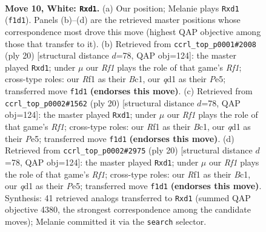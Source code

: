 \documentclass[11pt]{article}
\begin{document}
\clearpage

\begin{figure}[p]\centering
\begin{subfigure}{0.46\textwidth}\centering
\resizebox{\linewidth}{!}{%
\newchessgame
\chessboard[
  setfen={rnb2rk1/pp2bpp1/4pn2/2P4p/2N5/6P1/PP2PPBP/RNBq1RK1 w - - 0 10},
  showmover=false,
  pgfstyle=straightmove, color=movearrow, markmove={f1-d1}
]}
\caption{}
\end{subfigure}\hfill
\begin{subfigure}{0.46\textwidth}\centering
\resizebox{\linewidth}{!}{%
\newchessgame
\chessboard[
  setfen={r4rk1/ppp1ppbp/4bnp1/4P3/8/5NP1/PP2PPBP/R1Bq1RK1 w - - 0 11},
  showmover=false,
  pgfstyle=straightmove, color=movearrow, markmove={f1-d1}
]}
\caption{}
\end{subfigure}
\\[4pt]
\begin{subfigure}{0.46\textwidth}\centering
\resizebox{\linewidth}{!}{%
\newchessgame
\chessboard[
  setfen={r4rk1/ppp1ppbp/4bnp1/4P3/8/5NP1/PP2PPBP/R1Bq1RK1 w - - 0 11},
  showmover=false,
  pgfstyle=straightmove, color=movearrow, markmove={f1-d1}
]}
\caption{}
\end{subfigure}\hfill
\begin{subfigure}{0.46\textwidth}\centering
\resizebox{\linewidth}{!}{%
\newchessgame
\chessboard[
  setfen={r4rk1/ppp1ppbp/4bnp1/4P3/8/5NP1/PP2PPBP/R1Bq1RK1 w - - 0 11},
  showmover=false,
  pgfstyle=straightmove, color=movearrow, markmove={f1-d1}
]}
\caption{}
\end{subfigure}
\caption{\textbf{Move 10, White: \texttt{Rxd1}.} (a) Our position; Melanie plays \texttt{Rxd1} (\texttt{f1d1}). Panels (b)--(d) are the retrieved master positions whose correspondence most drove this move (highest QAP objective among those that transfer to it). (b) Retrieved from \texttt{ccrl\_top\_p0001\#2008} (ply 20) [structural distance $d$=78, QAP obj=124]: the master played \texttt{Rxd1}; under $\mu$ our \emph{Rf1} plays the role of that game's \emph{Rf1}; cross-type roles: our \emph{R}f1 as their \emph{B}c1, our \emph{q}d1 as their \emph{P}e5; transferred move \texttt{f1d1} \textbf{(endorses this move)}. (c) Retrieved from \texttt{ccrl\_top\_p0002\#1562} (ply 20) [structural distance $d$=78, QAP obj=124]: the master played \texttt{Rxd1}; under $\mu$ our \emph{Rf1} plays the role of that game's \emph{Rf1}; cross-type roles: our \emph{R}f1 as their \emph{B}c1, our \emph{q}d1 as their \emph{P}e5; transferred move \texttt{f1d1} \textbf{(endorses this move)}. (d) Retrieved from \texttt{ccrl\_top\_p0002\#2975} (ply 20) [structural distance $d$=78, QAP obj=124]: the master played \texttt{Rxd1}; under $\mu$ our \emph{Rf1} plays the role of that game's \emph{Rf1}; cross-type roles: our \emph{R}f1 as their \emph{B}c1, our \emph{q}d1 as their \emph{P}e5; transferred move \texttt{f1d1} \textbf{(endorses this move)}. Synthesis: 41 retrieved analogs transferred to \texttt{Rxd1} (summed QAP objective 4380, the strongest correspondence among the candidate moves); Melanie committed it via the \texttt{search} selector.}
\label{fig:thought-m18}
\end{figure}
\end{document}
